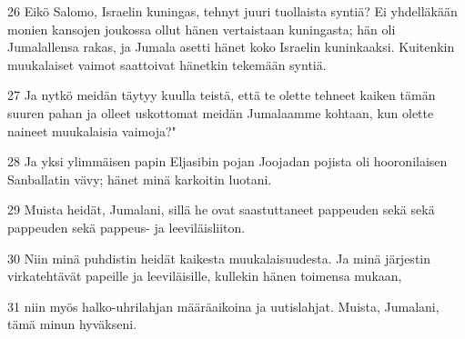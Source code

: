 \par 26 Eikö Salomo, Israelin kuningas, tehnyt juuri tuollaista syntiä? Ei yhdelläkään monien kansojen joukossa ollut hänen vertaistaan kuningasta; hän oli Jumalallensa rakas, ja Jumala asetti hänet koko Israelin kuninkaaksi. Kuitenkin muukalaiset vaimot saattoivat hänetkin tekemään syntiä.
\par 27 Ja nytkö meidän täytyy kuulla teistä, että te olette tehneet kaiken tämän suuren pahan ja olleet uskottomat meidän Jumalaamme kohtaan, kun olette naineet muukalaisia vaimoja?"
\par 28 Ja yksi ylimmäisen papin Eljasibin pojan Joojadan pojista oli hooronilaisen Sanballatin vävy; hänet minä karkoitin luotani.
\par 29 Muista heidät, Jumalani, sillä he ovat saastuttaneet pappeuden sekä sekä pappeuden sekä pappeus- ja leeviläisliiton.
\par 30 Niin minä puhdistin heidät kaikesta muukalaisuudesta. Ja minä järjestin virkatehtävät papeille ja leeviläisille, kullekin hänen toimensa mukaan,
\par 31 niin myös halko-uhrilahjan määräaikoina ja uutislahjat. Muista, Jumalani, tämä minun hyväkseni.


